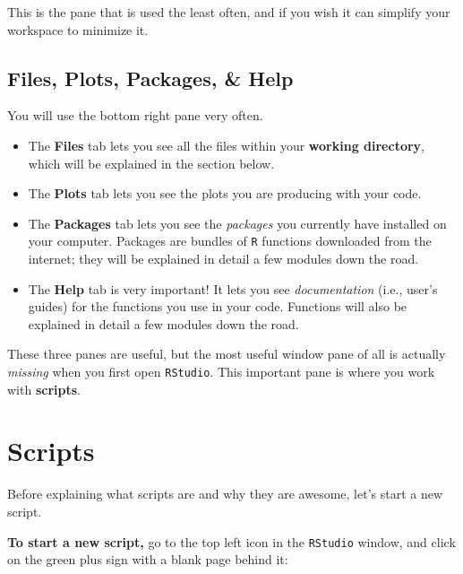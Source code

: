 \documentclass[
]{book}
\providecommand{\tightlist}{%
  \setlength{\itemsep}{0pt}\setlength{\parskip}{0pt}}
\begin{document}
This is the pane that is used the least often, and if you wish it can simplify your workspace to minimize it.

\hypertarget{files-plots-packages-help}{%
\subsection*{Files, Plots, Packages, \& Help}\label{files-plots-packages-help}}

You will use the bottom right pane very often.

\begin{itemize}
\tightlist
\item
  The \textbf{Files} tab lets you see all the files within your \textbf{working directory}, which will be explained in the section below.\\
\item
  The \textbf{Plots} tab lets you see the plots you are producing with your code.\\
\item
  The \textbf{Packages} tab lets you see the \emph{packages} you currently have installed on your computer. Packages are bundles of \texttt{R} functions downloaded from the internet; they will be explained in detail a few modules down the road.\\
\item
  The \textbf{Help} tab is very important! It lets you see \emph{documentation} (i.e., user's guides) for the functions you use in your code. Functions will also be explained in detail a few modules down the road.
\end{itemize}

These three panes are useful, but the most useful window pane of all is actually \emph{missing} when you first open \texttt{RStudio}. This important pane is where you work with \textbf{scripts}.

\hypertarget{scripts}{%
\section*{Scripts}\label{scripts}}

Before explaining what scripts are and why they are awesome, let's start a new script.

\textbf{To start a new script,} go to the top left icon in the \texttt{RStudio} window, and click on the green plus sign with a blank page behind it:
\end{document}
